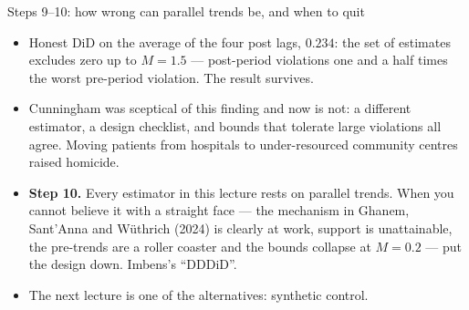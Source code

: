 \documentclass[
  11pt,
  ignorenonframetext,
  aspectratio=169,
]{beamer}
\providecommand{\tightlist}{%
  \setlength{\itemsep}{0pt}\setlength{\parskip}{0pt}}
\begin{document}
\begin{frame}{Steps 9--10: how wrong can parallel trends be, and when to
quit}
\protect{}\label{steps-910-how-wrong-can-parallel-trends-be-and-when-to-quit}
\begin{itemize}
\tightlist
\item
  Honest DiD on the average of the four post lags, \(0.234\): the set of
  estimates excludes zero up to \(M = 1.5\) --- post-period violations
  one and a half times the worst pre-period violation. The result
  survives.
\item
  Cunningham was sceptical of this finding and now is not: a different
  estimator, a design checklist, and bounds that tolerate large
  violations all agree. Moving patients from hospitals to
  under-resourced community centres raised homicide.
\end{itemize}

\vspace{0.3em}

\begin{itemize}
\tightlist
\item
  \textbf{Step 10.} Every estimator in this lecture rests on parallel
  trends. When you cannot believe it with a straight face --- the
  mechanism in Ghanem, Sant'Anna and Wüthrich (2024) is clearly at work,
  support is unattainable, the pre-trends are a roller coaster and the
  bounds collapse at \(M = 0.2\) --- put the design down. Imbens's
  ``DDDiD''.
\item
  The next lecture is one of the alternatives: synthetic control.
\end{itemize}
\end{frame}
\end{document}
